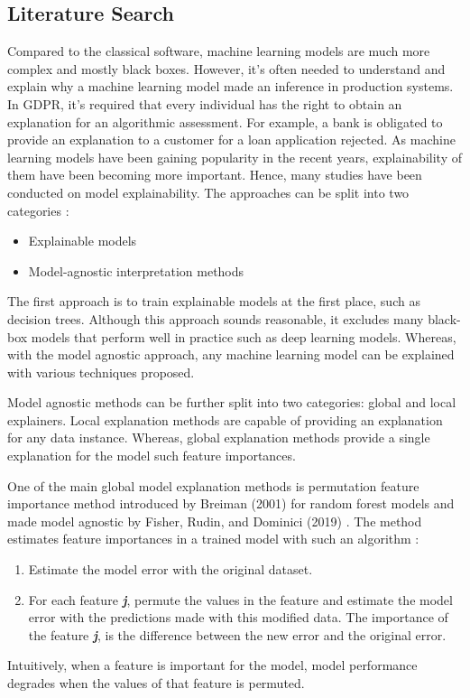 \documentclass[conference]{IEEEtran}
\begin{document}
\subsection{Literature Search}

Compared to the classical software, machine learning models are much more complex and mostly black boxes. 
However, it's often needed to understand and explain why a machine learning model 
made an inference in production systems. In GDPR, it's required that every individual has 
the right to obtain an explanation for an algorithmic assessment. For example, a
bank is obligated to provide an explanation to a customer for a loan application rejected.
As machine learning models have been gaining popularity in the recent years, explainability
of them have been becoming more important. Hence, many studies have been conducted on model explainability. 
The approaches can be split into two categories \cite{molnar2019}: 
\begin{itemize}
    \item Explainable models
    \item Model-agnostic interpretation methods
\end{itemize}
The first approach is to train explainable models at the first place, such as decision trees. Although this approach
sounds reasonable, it excludes many black-box models that perform well in practice such as
deep learning models. Whereas, with the model agnostic approach, any machine learning model
can be explained with various techniques proposed. 

Model agnostic methods can be further split into two categories: global and local 
explainers. Local explanation methods are capable of providing an explanation for
any data instance. Whereas, global explanation methods provide a single explanation 
for the model such feature importances.

One of the main global model explanation methods is permutation 
feature importance method introduced by Breiman (2001) \cite{Breiman2001} for random forest models and made model agnostic by
Fisher, Rudin, and Dominici (2019) \cite{Fisher2019}. The method estimates feature importances in a trained model 
with such an algorithm \cite{molnar2019}:
\begin{enumerate}
    \item Estimate the model error with the original dataset.
    \item For each feature \textbf{\textit{j}}, permute the values in the feature and 
    estimate the model error with the predictions made with this modified data. 
    The importance of the feature \textbf{\textit{j}}, is the difference between the new error and 
    the original error. 
\end{enumerate}
Intuitively, when a feature is important for the model, model performance degrades
when the values of that feature is permuted. 
\end{document}
